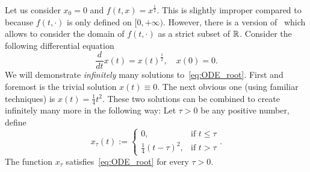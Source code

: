 \begin{eg}
	Let us consider $x_0 = 0$ and $f(t,x) = x^\frac{1}{2}$. This is slightly improper compared to~ because $f(t,\cdot)$ is only defined on $[0,+\infty)$. However, there is a version of~ which allows to consider the domain of $f(t,\cdot)$ as a strict subset of $\mathbb{R}$. Consider the following differential equation
	\begin{equation}
		\label{eq:ODE_root}
		\frac{d}{dt}x(t) = x(t)^\frac{1}{2},\quad x(0) = 0.
	\end{equation}
	We will demonstrate \textit{infinitely} many solutions to~\eqref{eq:ODE_root}. First and foremost is the trivial solution $x(t) \equiv 0$. The next obvious one (using familiar techniques) is $x(t) = \frac{1}{4}t^2$. These two solutions can be combined to create infinitely many more in the following way: Let $\tau>0$ be any positive number, define
	\[
	x_\tau(t):=\left\{
	\begin{array}{cc}
		0, 	&\text{if }t\le \tau 	\\
		\frac{1}{4}(t - \tau)^2, 	&\text{if }t > \tau
	\end{array}
	\right..
	\]
	The function $x_\tau$ satisfies~\eqref{eq:ODE_root} for every $\tau>0$.
\end{eg}